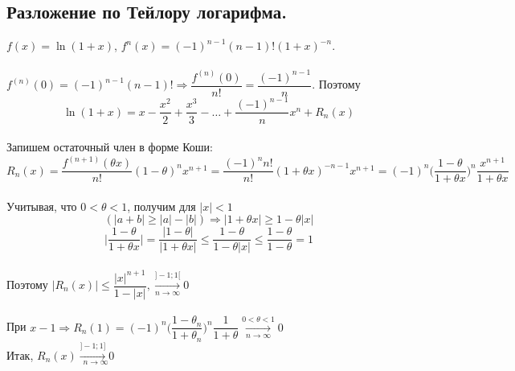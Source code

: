 	\subsection{Разложение по Тейлору логарифма.}
	$f(x) = \ln(1+x)$, $f^{n}(x) = (-1)^{n-1}(n-1)!(1+x)^{-n}$.\\\\
	$f^{(n)}(0) = (-1)^{n-1}(n-1)!\Rightarrow\dfrac{f^{(n)}(0)}{n!} = \dfrac{(-1)^{n-1}}{n}$.
	Поэтому
	$$\ln(1+x) = x- \frac{x^2}{2} + \frac{x^3}{3} - \ldots + \frac{(-1)^{n-1}}{n} x^n + R_n(x)$$\\
	Запишем остаточный член в форме Коши:\\
	$$R_n(x) = \frac{f^{(n+1)}(\theta x)}{n!}(1-\theta)^n x^{n+1} = \frac{(-1)^n n!}{n!}(1+\theta x)^{-n-1} x^{n+1} = (-1)^n \Big(\frac{1-\theta}{1+\theta x}\Big)^n \frac{x^{n+1}}{1+\theta x}$$\\
	Учитывая, что $0 < \theta < 1$, получим для $|x| < 1$\\
	$$(|a+b| \geq |a| - |b|) \Rightarrow |1 + \theta x| \geq 1 - \theta |x|$$
	$$\Big|\frac{1 - \theta}{1 + \theta x}\Big| = \frac{|1 - \theta|}{|1 + \theta x|} \leq \frac{1 - \theta}{1 - \theta |x|} \leq \frac{1 - \theta}{1 - \theta} = 1$$\\
	Поэтому $|R_n(x)| \leq \dfrac{|x|^{n+1}}{1-|x|}, \underset{n \to \infty}{\overset{]-1;1[}{\longrightarrow}} 0$\\\\
	При $x-1 \Rightarrow R_n(1) = (-1)^n \Big(\dfrac{1-\theta_n}{1+\theta_n}\Big)^n \dfrac{1}{1+\theta} \underset{n \to \infty}{\overset{0 < \theta < 1}{\longrightarrow}} 0$\\
	Итак, $R_n(x) \underset{n \to \infty}{\overset{]-1;1]}{\longrightarrow} 0}$\\
